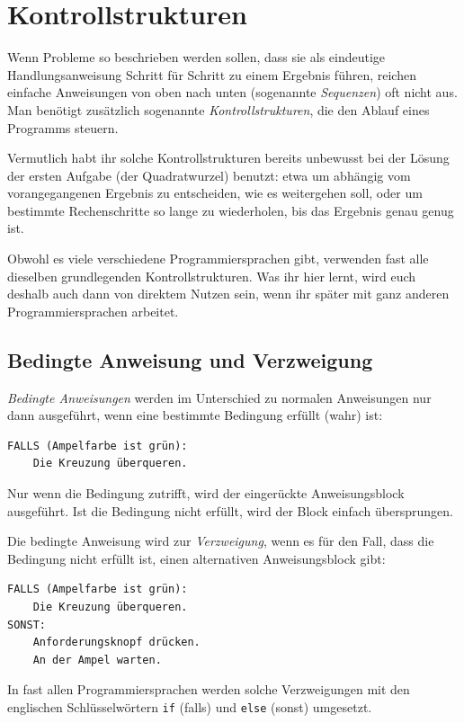 \section{Kontrollstrukturen}

Wenn Probleme so beschrieben werden sollen, dass sie als eindeutige
Handlungsanweisung Schritt für Schritt zu einem Ergebnis führen, reichen
einfache Anweisungen von oben nach unten (sogenannte \emph{Sequenzen}) oft nicht
aus. Man benötigt zusätzlich sogenannte \emph{Kontrollstrukturen}, die den
Ablauf eines Programms steuern.

Vermutlich habt ihr solche Kontrollstrukturen bereits unbewusst bei der Lösung
der ersten Aufgabe (der Quadratwurzel) benutzt: etwa um abhängig vom
vorangegangenen Ergebnis zu entscheiden, wie es weitergehen soll, oder um
bestimmte Rechenschritte so lange zu wiederholen, bis das Ergebnis genau genug
ist.

Obwohl es viele verschiedene Programmiersprachen gibt, verwenden fast alle
dieselben grundlegenden Kontrollstrukturen. Was ihr hier lernt, wird euch
deshalb auch dann von direktem Nutzen sein, wenn ihr später mit ganz anderen
Programmiersprachen arbeitet.


\subsection{Bedingte Anweisung und Verzweigung}

\emph{Bedingte Anweisungen} werden im Unterschied zu normalen Anweisungen nur
dann ausgeführt, wenn eine bestimmte Bedingung erfüllt (wahr) ist:

\begin{lstlisting}
FALLS (Ampelfarbe ist grün):
    Die Kreuzung überqueren.
\end{lstlisting}

Nur wenn die Bedingung zutrifft, wird der eingerückte Anweisungsblock
ausgeführt. Ist die Bedingung nicht erfüllt, wird der Block einfach
übersprungen.

Die bedingte Anweisung wird zur \emph{Verzweigung}, wenn es für den Fall, dass
die Bedingung nicht erfüllt ist, einen alternativen Anweisungsblock gibt:

\begin{lstlisting}
FALLS (Ampelfarbe ist grün):
    Die Kreuzung überqueren.
SONST:
    Anforderungsknopf drücken.
    An der Ampel warten.
\end{lstlisting}

In fast allen Programmiersprachen werden solche Verzweigungen mit den englischen
Schlüsselwörtern \lstinline|if| (falls) und \lstinline|else| (sonst) umgesetzt.


